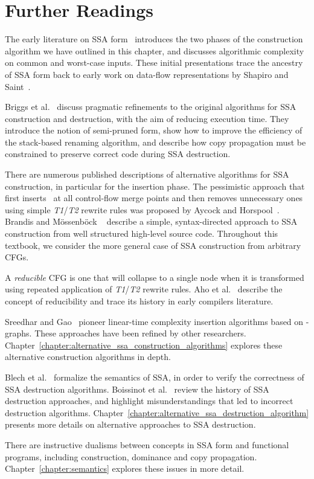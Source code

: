 {\section{Further Readings}
\label{sec:classical_construction_algorithm:reading}

The early literature on SSA form~\cite{cytron89efficient,cytron91efficiently} introduces the two phases of the construction algorithm we have outlined in this chapter, and discusses algorithmic complexity on common and worst-case inputs. 
These initial presentations trace the ancestry of SSA form back to early work on data-flow representations by Shapiro and Saint~\cite{shapiro69representation}.

Briggs et al.~\cite{briggs98practical} discuss pragmatic refinements to the original algorithms for SSA construction and destruction, with the aim of reducing execution time. 
They introduce the notion of semi-pruned form, show how to improve the efficiency of the stack-based renaming algorithm, and describe how copy propagation must be constrained to preserve correct code during SSA destruction.

There are numerous published descriptions of alternative algorithms for SSA construction, in particular for the \phifun insertion phase. 
The pessimistic approach that first inserts \phifuns\ at all control-flow merge points and then removes unnecessary ones using simple \emph{T1}/\emph{T2} rewrite rules was proposed by Aycock and Horspool~\cite{aycock00simple}. 
Brandis and M\"{o}ssenb\"{o}ck ~\cite{brandis94single} describe a simple, syntax-directed approach to SSA construction from well structured high-level source code. 
Throughout this textbook, we consider the more general case of SSA construction from arbitrary CFGs.

A \textit{reducible} CFG is one that will collapse to a single node when it is transformed using repeated application of \emph{T1}/\emph{T2} rewrite rules. 
Aho et al.~\cite{aho86compilers} describe the concept of reducibility and trace its history in early compilers literature.

Sreedhar and Gao~\cite{Sreedhar:1995:PoPL} pioneer linear-time complexity \phifun insertion algorithms based on \DJ-graphs. 
These approaches have been refined by other researchers. 
Chapter~\ref{chapter:alternative_ssa_construction_algorithms} explores these alternative construction algorithms in depth.


Blech et al.~\cite{blech05optimizing} formalize the semantics of SSA, in order to verify the correctness of SSA destruction algorithms. 
Boissinot et al.~\cite{boissinot09revisiting} review the history of SSA destruction approaches, and highlight misunderstandings that led to incorrect destruction algorithms. 
Chapter~\ref{chapter:alternative_ssa_destruction_algorithm} presents more details on alternative approaches to SSA destruction.

There are instructive dualisms between concepts in SSA form and functional programs, including construction, dominance and copy propagation. 
Chapter~\ref{chapter:semantics} explores these issues in more detail.


}

